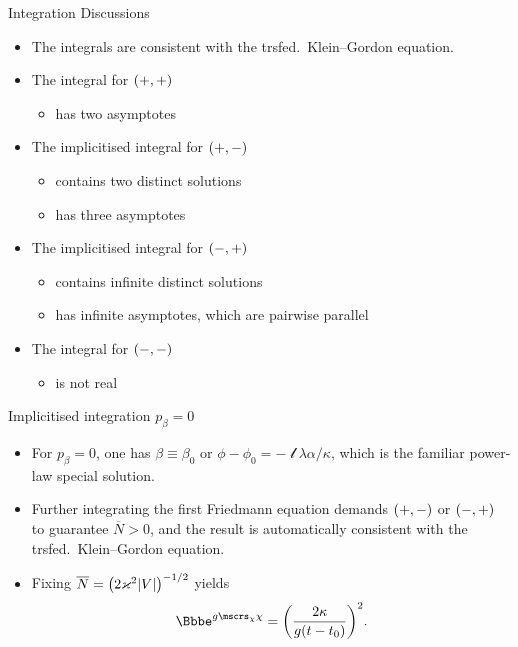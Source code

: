 \documentclass[9pt]{beamer}
\begin{document}
\begin{frame}%
{Integration}%
{Discussions}
\begin{itemize}
\item The integrals are consistent with the trsfed.\ Klein--Gordon equation.
\item The integral for ${\left(+,+\right)}$
\begin{itemize}
	\item has two asymptotes
\end{itemize}
\item The implicitised integral for ${\left(+,-\right)}$ 
\begin{itemize}
	\item contains two distinct solutions
	\item has three asymptotes
\end{itemize}
\item The implicitised integral for ${\left(-,+\right)}$
\begin{itemize}
	\item contains infinite distinct solutions
	\item has infinite asymptotes, which are pairwise parallel
\end{itemize}
\item The integral for ${\left(-,-\right)}$
\begin{itemize}
	\item is not real
\end{itemize}
\end{itemize}
\end{frame}

\begin{frame}%
{Implicitised integration}%
{$p_\beta = 0$}
\begin{itemize}
\item For $p_\beta = 0$, one has $\beta \equiv \beta_0$ or $\phi-\phi_0 =
-\mscrl\lambda\alpha/\kappa$, which is the familiar power-law special
solution.

\item Further integrating the first Friedmann equation demands ${\left(+,-\right)}$
or ${\left(-,+\right)}$ to guarantee $\overline{N} > 0$, and the result is
automatically consistent with the trsfed.\ Klein--Gordon equation.

\item Fixing $\overline{N} = {\left(2\varkappa^2{\left|V\right|}\right)}^{-1/2}$ yields
\begin{align}
\ee^{g\mscrs_\chi\chi} = \rbr{\frac{2\kappa}{g\rbr{t-t_0}}}^2.
\end{align}
\end{itemize}
\end{frame}
\end{document}
